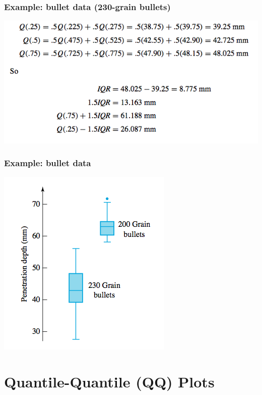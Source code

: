 \documentclass{beamer}
\numberwithin{equation}{section}
\begin{document}
\begin{frame}
\frametitle{Example: bullet data (230-grain bullets)}
\begin{center}
 \includegraphics{../../fig/bulletquartiles.png}
\end{center}
\end{frame}

\begin{frame}
\frametitle{Example: bullet data}
\begin{center}
 \includegraphics{../../fig/bulletbox.png}
\end{center}
\end{frame}


\section{Quantile-Quantile (QQ) Plots}
\end{document}
